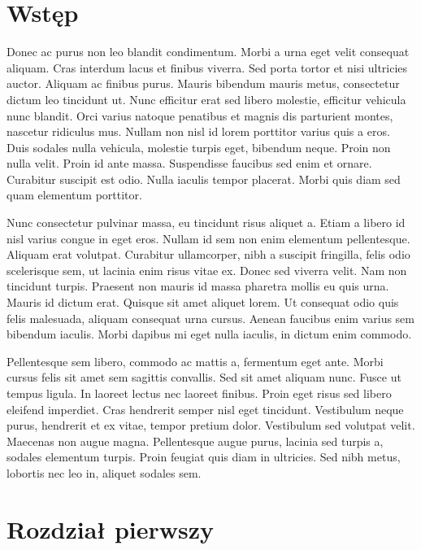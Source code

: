 \documentclass[polish,engineering]{wizthesis}
\begin{document}
\tableofcontents

\mainmatter %

{\backmatter %
\chapter{Wstęp}

Donec ac purus non leo blandit condimentum. Morbi a urna eget velit consequat
aliquam. Cras interdum lacus et finibus viverra. Sed porta tortor et nisi
ultricies auctor. Aliquam ac finibus purus. Mauris bibendum mauris metus,
consectetur dictum leo tincidunt ut. Nunc efficitur erat sed libero molestie,
efficitur vehicula nunc blandit. Orci varius natoque penatibus et magnis dis
parturient montes, nascetur ridiculus mus. Nullam non nisl id lorem porttitor
varius quis a eros. Duis sodales nulla vehicula, molestie turpis eget, bibendum
neque. Proin non nulla velit. Proin id ante massa. Suspendisse faucibus sed enim
et ornare. Curabitur suscipit est odio. Nulla iaculis tempor placerat. Morbi
quis diam sed quam elementum porttitor.

Nunc consectetur pulvinar massa, eu tincidunt risus aliquet a. Etiam a libero id
nisl varius congue in eget eros. Nullam id sem non enim elementum pellentesque.
Aliquam erat volutpat. Curabitur ullamcorper, nibh a suscipit fringilla, felis
odio scelerisque sem, ut lacinia enim risus vitae ex. Donec sed viverra velit.
Nam non tincidunt turpis. Praesent non mauris id massa pharetra mollis eu quis
urna. Mauris id dictum erat. Quisque sit amet aliquet lorem. Ut consequat odio
quis felis malesuada, aliquam consequat urna cursus. Aenean faucibus enim varius
sem bibendum iaculis. Morbi dapibus mi eget nulla iaculis, in dictum enim
commodo.

Pellentesque sem libero, commodo ac mattis a, fermentum eget ante. Morbi cursus
felis sit amet sem sagittis convallis. Sed sit amet aliquam nunc. Fusce ut
tempus ligula. In laoreet lectus nec laoreet finibus. Proin eget risus sed
libero eleifend imperdiet. Cras hendrerit semper nisl eget tincidunt. Vestibulum
neque purus, hendrerit et ex vitae, tempor pretium dolor. Vestibulum sed
volutpat velit. Maecenas non augue magna. Pellentesque augue purus, lacinia sed
turpis a, sodales elementum turpis. Proin feugiat quis diam in ultricies. Sed
nibh metus, lobortis nec leo in, aliquet sodales sem.
}

\chapter{Rozdział pierwszy}
\end{document}
